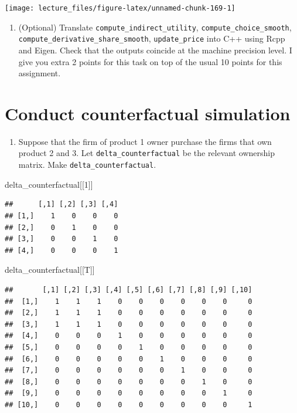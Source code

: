 \documentclass[
]{book}
\newenvironment{Shaded}{\begin{snugshade}}{\end{snugshade}}
\newcommand{\DecValTok}[1]{\textcolor[rgb]{0.00,0.00,0.81}{#1}}
\newcommand{\NormalTok}[1]{#1}
\providecommand{\tightlist}{%
  \setlength{\itemsep}{0pt}\setlength{\parskip}{0pt}}
\begin{document}
\begin{center}\texttt{[image: lecture\_files/figure-latex/unnamed-chunk-169-1]} \end{center}

\begin{enumerate}
\def\labelenumi{\arabic{enumi}.}
\setcounter{enumi}{1}
\tightlist
\item
  (Optional) Translate \texttt{compute\_indirect\_utility}, \texttt{compute\_choice\_smooth}, \texttt{compute\_derivative\_share\_smooth}, \texttt{update\_price} into C++ using Rcpp and Eigen. Check that the outputs coincide at the machine precision level. I give you extra 2 points for this task on top of the usual 10 points for this assignment.
\end{enumerate}

\hypertarget{conduct-counterfactual-simulation}{%
\section{Conduct counterfactual simulation}\label{conduct-counterfactual-simulation}}

\begin{enumerate}
\def\labelenumi{\arabic{enumi}.}
\tightlist
\item
  Suppose that the firm of product 1 owner purchase the firms that own product 2 and 3. Let \texttt{delta\_counterfactual} be the relevant ownership matrix. Make \texttt{delta\_counterfactual}.
\end{enumerate}

\begin{Shaded}
\begin{Highlighting}[]
\NormalTok{delta\_counterfactual[[}\DecValTok{1}\NormalTok{]]}
\end{Highlighting}
\end{Shaded}

\begin{verbatim}
##      [,1] [,2] [,3] [,4]
## [1,]    1    0    0    0
## [2,]    0    1    0    0
## [3,]    0    0    1    0
## [4,]    0    0    0    1
\end{verbatim}

\begin{Shaded}
\begin{Highlighting}[]
\NormalTok{delta\_counterfactual[[T]]}
\end{Highlighting}
\end{Shaded}

\begin{verbatim}
##       [,1] [,2] [,3] [,4] [,5] [,6] [,7] [,8] [,9] [,10]
##  [1,]    1    1    1    0    0    0    0    0    0     0
##  [2,]    1    1    1    0    0    0    0    0    0     0
##  [3,]    1    1    1    0    0    0    0    0    0     0
##  [4,]    0    0    0    1    0    0    0    0    0     0
##  [5,]    0    0    0    0    1    0    0    0    0     0
##  [6,]    0    0    0    0    0    1    0    0    0     0
##  [7,]    0    0    0    0    0    0    1    0    0     0
##  [8,]    0    0    0    0    0    0    0    1    0     0
##  [9,]    0    0    0    0    0    0    0    0    1     0
## [10,]    0    0    0    0    0    0    0    0    0     1
\end{verbatim}
\end{document}
